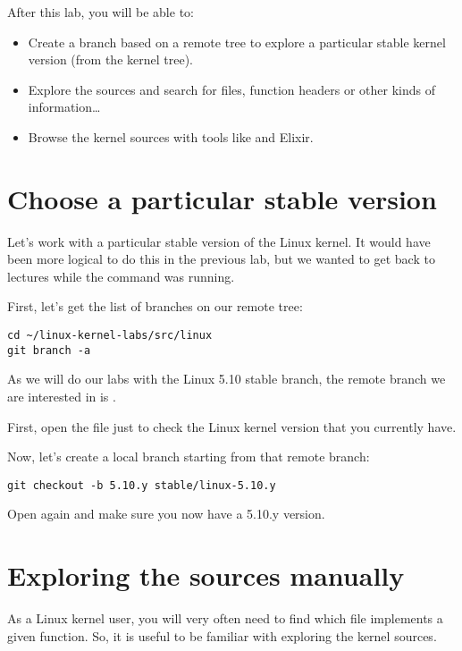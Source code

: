 
After this lab, you will be able to:

\begin{itemize}

\item Create a branch based on a remote tree to explore a particular
      stable kernel version (from the  kernel tree).
\item Explore the sources and search for files, function headers or
  other kinds of information\ldots
\item Browse the kernel sources with tools like  and Elixir.
\end{itemize}

\section{Choose a particular stable version}

Let's work with a particular stable version of the Linux kernel.
It would have been more logical to do this in the previous lab, but we
wanted to get back to lectures while the  command was
running.

First, let's get the list of branches on our  remote tree:

\begin{verbatim}
cd ~/linux-kernel-labs/src/linux
git branch -a
\end{verbatim}

As we will do our labs with the Linux 5.10 stable branch, the remote branch
we are interested in is .

First, open the  file just to check the Linux kernel
version that you currently have.

Now, let's create a local branch starting from that remote branch:
\begin{verbatim}
git checkout -b 5.10.y stable/linux-5.10.y
\end{verbatim}

Open  again and make sure you now have a 5.10.y version.

\section{Exploring the sources manually}

As a Linux kernel user, you will very often need to find which file
implements a given function. So, it is useful to be familiar with
exploring the kernel sources.

